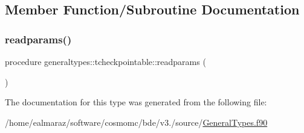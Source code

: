 \subsection{Member Function/\+Subroutine Documentation}
\mbox{\label{structgeneraltypes_1_1tcheckpointable_abe5c39c69555ec30baa7e4d103f27c57}} 
\subsubsection{\texorpdfstring{readparams()}{readparams()}}
{\footnotesize\ttfamily procedure generaltypes\+::tcheckpointable\+::readparams (\begin{DoxyParamCaption}{ }\end{DoxyParamCaption})\hspace{0.3cm}{\ttfamily [private]}}



The documentation for this type was generated from the following file\+:\begin{DoxyCompactItemize}
\item 
/home/ealmaraz/software/cosmomc/bde/v3./source/\mbox{\hyperlink{GeneralTypes_8f90}{General\+Types.\+f90}}\end{DoxyCompactItemize}
